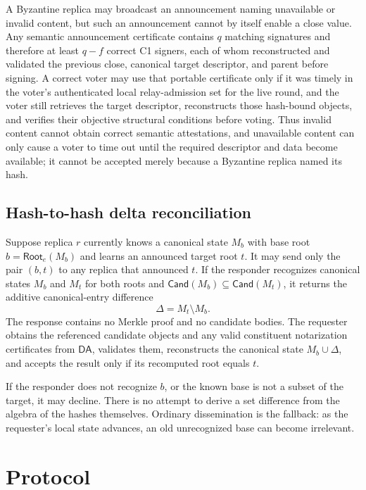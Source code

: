 \documentclass[11pt]{article}
\theoremstyle{definition}
\theoremstyle{remark}
\newcommand{\DA}{\mathsf{DA}}
\newcommand{\Root}{\mathsf{Root}}
\newcommand{\Cand}{\mathsf{Cand}}
\begin{document}
A Byzantine replica may broadcast an announcement naming unavailable or invalid content, but such an announcement cannot by itself enable a close value. Any semantic announcement certificate contains $q$ matching signatures and therefore at least $q-f$ correct C1 signers, each of whom reconstructed and validated the previous close, canonical target descriptor, and parent before signing. A correct voter may use that portable certificate only if it was timely in the voter's authenticated local relay-admission set for the live round, and the voter still retrieves the target descriptor, reconstructs those hash-bound objects, and verifies their objective structural conditions before voting. Thus invalid content cannot obtain correct semantic attestations, and unavailable content can only cause a voter to time out until the required descriptor and data become available; it cannot be accepted merely because a Byzantine replica named its hash.

\subsection{Hash-to-hash delta reconciliation}
\label{subsec:reconciliation}

Suppose replica $r$ currently knows a canonical state $M_b$ with base root $b=\Root_e(M_b)$ and learns an announced target root $t$. It may send only the pair $(b,t)$ to any replica that announced $t$. If the responder recognizes canonical states $M_b$ and $M_t$ for both roots and $\Cand(M_b)\subseteq\Cand(M_t)$, it returns the additive canonical-entry difference
\[
  \Delta=M_t\setminus M_b.
\]
The response contains no Merkle proof and no candidate bodies. The requester obtains the referenced candidate objects and any valid constituent notarization certificates from $\DA$, validates them, reconstructs the canonical state $M_b\cup\Delta$, and accepts the result only if its recomputed root equals $t$.

If the responder does not recognize $b$, or the known base is not a subset of the target, it may decline. There is no attempt to derive a set difference from the algebra of the hashes themselves. Ordinary dissemination is the fallback: as the requester's local state advances, an old unrecognized base can become irrelevant.

\section{Protocol}
\end{document}
